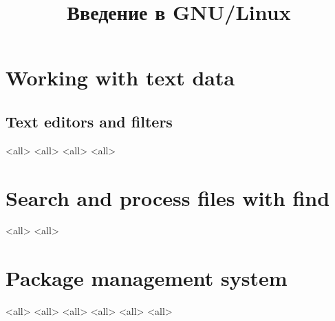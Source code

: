 

\title{Введение в GNU/Linux}








\begin{frame}
	\frametitle{}
	\titlepage
	\vspace{-0.5cm}
	\begin{center}
	\end{center}
\end{frame}





\section{Working with text data}

\subsection{Text editors and filters}
\mode<all>{}
\mode<all>{} %
\mode<all>{} %
\mode<all>{}
\section{Search and process files with find}
\mode<all>{}
\mode<all>{}

\section{Package management system}
\mode<all>{}
\mode<all>{}
\mode<all>{}
\mode<all>{}
\mode<all>{}
\mode<all>{}



